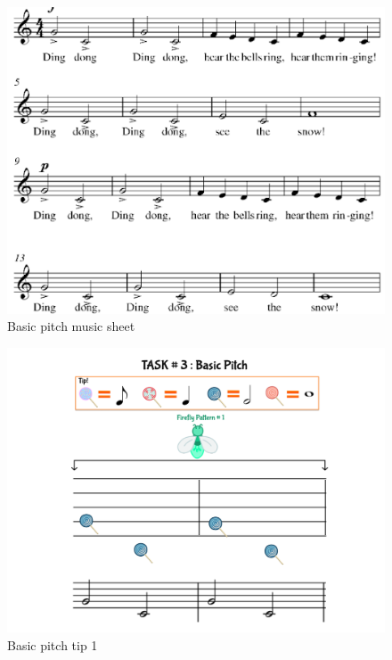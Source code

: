 \begin{figure}[H]
    \centering
    \includegraphics[width=12cm]{figures/NewFigures/BasicPitchMusicSheet.png}
    \caption{Basic pitch music sheet}
    \label{fig:BasicPitchMusicSheet}
\end{figure}

\begin{figure}[H]
    \centering
    \includegraphics[width=12cm]{figures/NewFigures/BasicPitchTip1.png}
    \caption{Basic pitch tip 1}
    \label{fig:BasicPitchTip1}
\end{figure}

